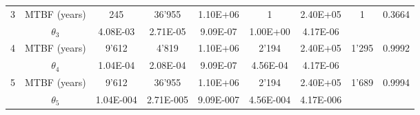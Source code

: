 \begin{table}[h]
\begin{tabular}{|l|l|l|l|l|l|l|l|l|}
\hline
\multicolumn{1}{|c|}{3} & \multicolumn{1}{c|}{MTBF (years)} & \multicolumn{1}{c|}{245} & \multicolumn{1}{c|}{36'955} & \multicolumn{1}{c|}{1.10E+06} & \multicolumn{1}{c|}{1} & \multicolumn{1}{c|}{2.40E+05} & \multicolumn{1}{c|}{1} & \multicolumn{1}{c|}{0.3664} \\ 
\cline{2-7}
\multicolumn{1}{|c|}{} & \multicolumn{1}{c|}{$\theta_3$} & \multicolumn{1}{c|}{4.08E-03} & \multicolumn{1}{c|}{2.71E-05} & \multicolumn{1}{c|}{9.09E-07} & \multicolumn{1}{c|}{1.00E+00} & \multicolumn{1}{c|}{4.17E-06} & \multicolumn{1}{c|}{} & \multicolumn{1}{c|}{} \\ 
\hline
\multicolumn{1}{|c|}{4} & \multicolumn{1}{c|}{MTBF (years)} & \multicolumn{1}{c|}{9'612} & \multicolumn{1}{c|}{4'819} & \multicolumn{1}{c|}{1.10E+06} & \multicolumn{1}{c|}{2'194} & \multicolumn{1}{c|}{2.40E+05} & \multicolumn{1}{c|}{1'295} & \multicolumn{1}{c|}{0.9992} \\ 
\cline{2-7}
\multicolumn{1}{|c|}{} & \multicolumn{1}{c|}{$\theta_4$} & \multicolumn{1}{c|}{1.04E-04} & \multicolumn{1}{c|}{2.08E-04} & \multicolumn{1}{c|}{9.09E-07} & \multicolumn{1}{c|}{4.56E-04} & \multicolumn{1}{c|}{4.17E-06} & \multicolumn{1}{c|}{} & \multicolumn{1}{c|}{} \\ 
\hline
\multicolumn{1}{|c|}{5} & \multicolumn{1}{c|}{MTBF (years)} & \multicolumn{1}{c|}{9'612} & \multicolumn{1}{c|}{36'955} & \multicolumn{1}{c|}{1.10E+06} & \multicolumn{1}{c|}{2'194} & \multicolumn{1}{c|}{2.40E+05} & \multicolumn{1}{c|}{1'689} & \multicolumn{1}{c|}{0.9994} \\ 
\cline{2-7}
\multicolumn{1}{|c|}{} & \multicolumn{1}{c|}{$\theta_5$} & \multicolumn{1}{c|}{1.04E-004} & \multicolumn{1}{c|}{2.71E-005} & \multicolumn{1}{c|}{9.09E-007} & \multicolumn{1}{c|}{4.56E-004} & \multicolumn{1}{c|}{4.17E-006} & \multicolumn{1}{c|}{} & \multicolumn{1}{c|}{} \\ 
\hline
\end{tabular}
\label{tblavaimain:4}
\end{table}

